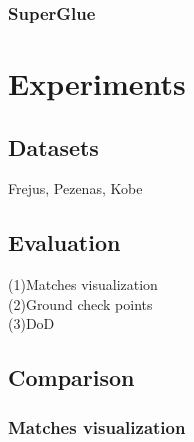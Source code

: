 \subsubsection{SuperGlue}

\section{Experiments}
\subsection{Datasets}
Frejus, Pezenas, Kobe\\
\subsection{Evaluation}

(1)Matches visualization\\
(2)Ground check points\\
(3)DoD\\

\subsection{Comparison}

\subsubsection{Matches visualization}

